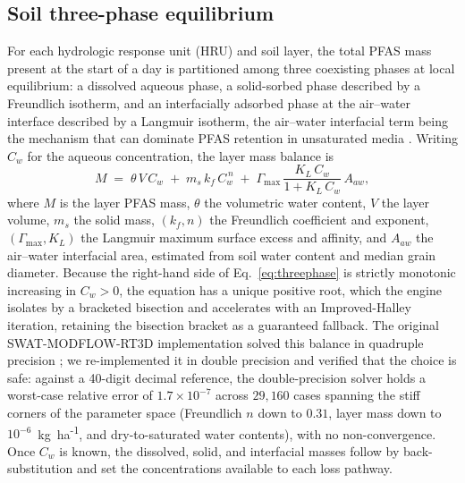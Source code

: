 \subsection{Soil three-phase equilibrium}
For each hydrologic response unit (HRU) and soil layer, the total PFAS mass present at the start of a day is partitioned among three coexisting phases at local equilibrium: a dissolved aqueous phase, a solid-sorbed phase described by a Freundlich isotherm, and an interfacially adsorbed phase at the air--water interface described by a Langmuir isotherm, the air--water interfacial term being the mechanism that can dominate PFAS retention in unsaturated media \citep{brusseau2018,guo2020,rafiei2023}. Writing $C_w$ for the aqueous concentration, the layer mass balance is
\begin{equation}
M \;=\; \theta\,V\,C_w \;+\; m_s\,k_f\,C_w^{\,n} \;+\; \Gamma_{\max}\,\frac{K_L\,C_w}{1+K_L\,C_w}\,A_{aw},
\label{eq:threephase}
\end{equation}
where $M$ is the layer PFAS mass, $\theta$ the volumetric water content, $V$ the layer volume, $m_s$ the solid mass, $(k_f,n)$ the Freundlich coefficient and exponent, $(\Gamma_{\max},K_L)$ the Langmuir maximum surface excess and affinity, and $A_{aw}$ the air--water interfacial area, estimated from soil water content and median grain diameter. Because the right-hand side of Eq.~\eqref{eq:threephase} is strictly monotonic increasing in $C_w>0$, the equation has a unique positive root, which the engine isolates by a bracketed bisection and accelerates with an Improved-Halley iteration, retaining the bisection bracket as a guaranteed fallback. The original SWAT-MODFLOW-RT3D implementation solved this balance in quadruple precision \citep{rafiei2023}; we re-implemented it in double precision and verified that the choice is safe: against a 40-digit decimal reference, the double-precision solver holds a worst-case relative error of $1.7\times10^{-7}$ across $29{,}160$ cases spanning the stiff corners of the parameter space (Freundlich $n$ down to $0.31$, layer mass down to $10^{-6}$~kg~ha\textsuperscript{-1}, and dry-to-saturated water contents), with no non-convergence. Once $C_w$ is known, the dissolved, solid, and interfacial masses follow by back-substitution and set the concentrations available to each loss pathway.

